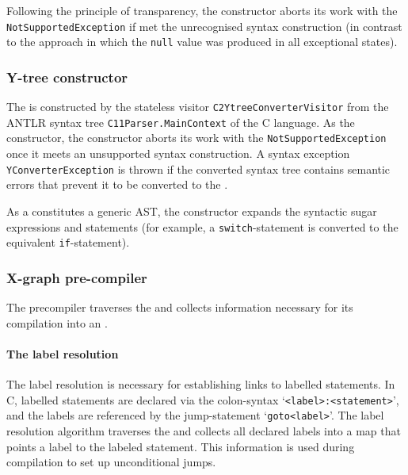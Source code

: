 Following the principle of transparency, the \wmodel{} constructor aborts its work with the \texttt{NotSupportedException} if met the unrecognised syntax construction (in contrast to the \porthos[1] approach in which the \texttt{null} value was produced in all exceptional states).



\subsubsection{Y-tree constructor}
\label{ch:impl:proc:y-constr}

The \ytree{} is constructed by the stateless visitor \texttt{C2YtreeConverterVisitor} from the ANTLR syntax tree \texttt{C11Parser.MainContext} of the C language.
As the \wmodel{} constructor, the \ytree{} constructor aborts its work with the \texttt{NotSupportedException} once it meets an unsupported syntax construction.
A syntax exception \texttt{YConverterException} is thrown if the converted syntax tree contains semantic errors that prevent it to be converted to the \ytree{}.

As a \ytree{} constitutes a generic AST, the \ytree{} constructor expands the syntactic sugar expressions and statements (for example, a \texttt{switch}-statement is converted to the equivalent \texttt{if}-statement).


\subsubsection{X-graph pre-compiler}
\label{ch:impl:proc:x-pre-compiler}

The precompiler traverses the \ytree{} and collects information necessary for its compilation into an \xgraph{}.



\paragraph{The label resolution}
\label{ch:impl:proc:x-pre-compiler:label}


The label resolution is necessary for establishing links to labelled statements. %
In C, labelled statements are declared via the colon-syntax `\texttt{<label>\;:\;<statement>}', and the labels are referenced by the jump-statement `\texttt{goto\;<label>}'.
The label resolution algorithm traverses the \ytree{} and collects all declared labels into a map that points a label to the labeled statement. %
This information is used during compilation to set up unconditional jumps.


